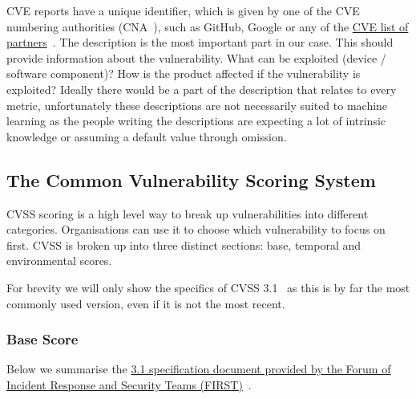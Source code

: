 \documentclass[12pt]{article}
\begin{document}
\bigskip

CVE reports have a unique identifier, which is given by one of the CVE numbering authorities (CNA~\cite{CNA}), such as
GitHub, Google or any of the \href{https://www.cve.org/PartnerInformation/ListofPartners}{CVE list of
	partners}~\cite{partners}.
The description is the most important part in our case. This should provide information about the
vulnerability. What can be exploited (device / software component)? How is the product affected if
the vulnerability is exploited? Ideally there would be a part of the description that relates to every metric,
unfortunately these descriptions are not necessarily suited to machine learning as the people
writing the descriptions are expecting a lot of intrinsic knowledge or assuming a default value
through omission.

\subsection{The Common Vulnerability Scoring System}

CVSS scoring is a high level way to break up vulnerabilities into different categories.
Organisations can use it to choose which vulnerability to focus on first. CVSS is broken up into
three distinct sections: base, temporal and environmental scores.

For brevity we will only show the specifics of CVSS 3.1~\cite{CVSS_31} as this is by far the most commonly used
version, even if it is not the most recent.

\subsubsection{Base Score}

Below we summarise the
\href{https://www.first.org/cvss/v3.1/specification-document}{3.1 specification document
	provided by the  Forum of Incident Response and Security Teams (FIRST)}~\cite{CVSS_31}.
\end{document}
